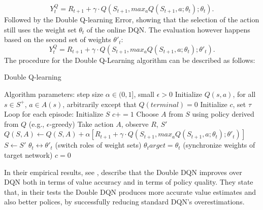 \documentclass[12pt,a4paper]{article}
\begin{document}
\begin{equation}
    \label{eq:q_target_untangled}
    Y_t^Q = R_{t+1} + \gamma \cdot Q(S_{t+1}, max_a Q(S_{t+1}, a;  \theta_t); \theta_t).
\end{equation}
Followed by the Double Q-learning Error, showing that the selection of the action still uses the weight set $\theta_t$ of the online DQN. The evaluation however happens based on the second set of weights $\theta'_t$: 
\begin{equation}
    \label{eq:double_q_target}
    Y_t^Q = R_{t+1} + \gamma \cdot Q(S_{t+1}, max_a Q(S_{t+1}, a;  \theta_t); \theta'_t).
\end{equation}
The procedure for the Double Q-Learning algorithm can be described as follows:
\begin{algorithm}
    \caption{Double Q-learning}
    \begin{algorithmic}
    \State Algorithm parameters: step size $\alpha \in (0, 1]$, small  $\epsilon > 0$
    \State Initialize $Q(s,a)$, for all $s\in S^+$, $a\in A(s)$, arbitrarily except that $Q(terminal)=0$
    \State Initialize $c$, set $\tau$
    \State Loop for each episode:
        \State Initialize $S$
        \State $c += 1$
            \State Choose $A$ from $S$ using policy derived from $Q$ (e.g., $\epsilon$-greedy)
            \State Take action $A$, observe $R$, $S'$
            \State $Q(S, A) \leftarrow Q(S, A) + \alpha [R_{t+1}+\gamma \cdot Q(S_{t+1}, max_a Q(S_{t+1}, a;  \theta_t); \theta'_t)]$
            \State $S \leftarrow S'$
            \State $\theta_t \leftrightarrow \theta'_t$ (switch roles of weight sets)
        \EndFor
            \State $\theta_target = \theta_t $ (synchronize weights of target network)
            \State $c = 0$
        \EndIf
    \EndWhile
    \end{algorithmic}
\end{algorithm}
\newpage
In their empirical results, see \cite{VanHasselt2015}, describe that the Double DQN improves over DQN both in terms of value accuracy and in terms of policy quality. They state that, in their tests the Double DQN produces more accurate value estimates and also better polices, by successfully reducing standard DQN's overestimations.
\end{document}
